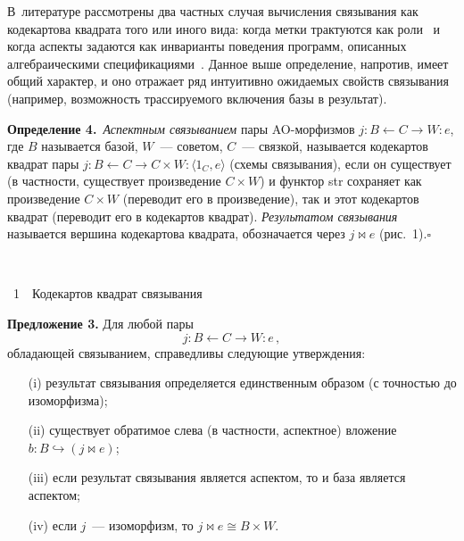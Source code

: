\begin{multicols}{2}
В~лите\-ра\-туре рассмотрены два частных случая вы\-чис\-ле\-ния 
связывания как кодекартова квадрата того или иного вида: когда метки 
трактуются как роли~\cite{24-kov} и когда аспекты задаются как инварианты 
поведения программ, описанных ал\-геб\-ра\-иче\-ски\-ми 
   спецификациями~\cite{25-kov}. Данное выше определение, напротив, имеет 
общий характер, и оно отражает ряд интуитивно ожидаемых свойств 
связывания (например, возможность трассируемого включения базы в 
результат).
  
  \medskip
  
  \noindent
  \textbf{Определение 4.}\ \textit{Аспектным связыванием} пары 
AO-мор\-физ\-мов $j : B\leftarrow C \rightarrow W : e$, где $B$ называется 
базой, $W$~--- советом, $C$~--- связкой, называется кодекартов квадрат пары $j 
: B\leftarrow C\rightarrow C\times W : \langle 1_C, e\rangle$ (схемы 
связывания), если он существует (в част\-ности, существует произведение $C\times 
W$) и функтор str сохраняет как произведение $C\times W$ (переводит его в 
произведение), так и этот кодекартов квадрат (переводит его в кодекартов 
квадрат). \textit{Результатом связывания} называется вершина кодекартова 
квадрата, обозначается через $j \bowtie e$ (рис.~1).\hfill$\square$

\vspace*{6pt}
   
   \begin{center}
 \mbox{%
 \epsfxsize=45.546mm
 }

 \vspace*{12pt}
 
 {{\figurename~1}\ \ \small{Кодекартов квадрат связывания}}
   \end{center}


\columnbreak


\addtocounter{figure}{1}




\noindent
\textbf{Предложение 3.} Для любой пары $$j: B\leftarrow C \rightarrow W : e\,,$$ 
обладающей связыванием, справедливы сле\-ду\-ющие утверждения:
\begin{itemize}
   \item[(i)] результат связывания определяется единственным образом (с 
точностью до изоморфизма);
   \item[(ii)] существует обратимое слева (в частности, аспектное) вложение $b : 
B \hookrightarrow  (j \bowtie e)$;
   \item[(iii)] если результат связывания является аспектом, то и база является 
аспектом;
   \item[(iv)] если $j$~--- изоморфизм, то $j \bowtie e \cong B\times W$.
   \end{itemize}
   

\end{multicols}
